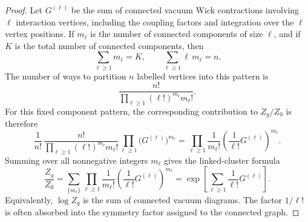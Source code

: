 \begin{proof}
Let \(G^{(\ell)}\) be the sum of connected vacuum Wick contractions involving
\(\ell\) interaction vertices, including the coupling factors and integration
over the \(\ell\) vertex positions. If \(m_\ell\) is the number of connected
components of size \(\ell\), and if \(K\) is the total number of connected
components, then
\[
  \sum_{\ell\ge1}m_\ell=K,
  \qquad
  \sum_{\ell\ge1}\ell\,m_\ell=n.
\]
The number of ways to partition \(n\) labelled vertices into this pattern is
\[
  \frac{n!}{\prod_{\ell\ge1}(\ell!)^{m_\ell}m_\ell!}.
\]
For this fixed component pattern, the corresponding contribution to
\(Z_g/Z_0\) is therefore
\[
  \frac{1}{n!}\,
  \frac{n!}{\prod_{\ell\ge1}(\ell!)^{m_\ell}m_\ell!}
  \prod_{\ell\ge1}\bigl(G^{(\ell)}\bigr)^{m_\ell}
  =
  \prod_{\ell\ge1}
  \frac{1}{m_\ell!}
  \left(\frac{1}{\ell!}G^{(\ell)}\right)^{m_\ell}.
\]
Summing over all nonnegative integers \(m_\ell\) gives the linked-cluster
formula
\[
  \frac{Z_g}{Z_0}
  =
  \sum_{\{m_\ell\}}
  \prod_{\ell\ge1}
  \frac{1}{m_\ell!}
  \left(\frac{1}{\ell!}G^{(\ell)}\right)^{m_\ell}
  =
  \exp\left[
    \sum_{\ell\ge1}\frac{1}{\ell!}G^{(\ell)}
  \right].
\]
Equivalently, \(\log Z_g\) is the sum of connected vacuum diagrams.
The factor \(1/\ell!\) is often absorbed into the symmetry factor assigned to
the connected graph.
\end{proof}


